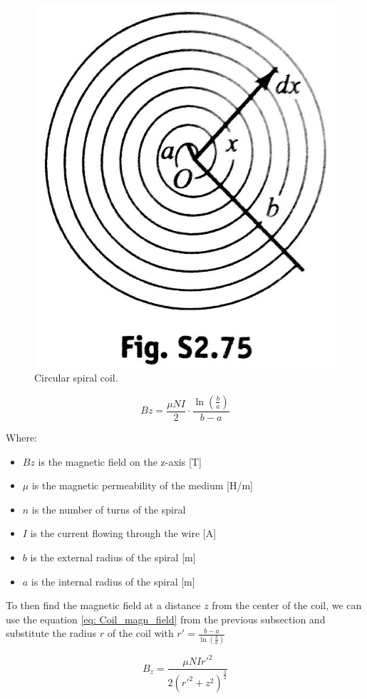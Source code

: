 \begin{figure}
    \centering
    \includegraphics[scale=0.4]{Chapters/Chapter2/PCB_coils/Figures/spiral_windings.jpg} %
    \caption[Coil spiral]{Circular spiral coil.}
    \label{fig: Coil spiral}
\end{figure}

\begin{equation}
    Bz = \frac{\mu N I}{2} \cdot \frac{\ln(\frac{b}{a})}{b-a} %
    \label{eq: Spiral_magn_field}
\end{equation}

Where:
\begin{itemize}
    \item $Bz$ is the magnetic field on the z-axis [T]
    \item $\mu$ is the magnetic permeability of the medium [H/m]
    \item $n$ is the number of turns of the spiral
    \item $I$ is the current flowing through the wire [A]
    \item $b$ is the external radius of the spiral [m]
    \item $a$ is the internal radius of the spiral [m]
\end{itemize}

To then find the magnetic field at a distance $z$ from the center of the coil, we can use the equation \eqref{eq: Coil_magn_field} from the previous subsection and substitute the radius $r$ of the coil with $r' = \frac{b-a}{\ln(\frac{b}{a})}$  

\begin{equation}
    B_z = \frac{\mu N I r'^2}{2(r'^2+z^2)^\frac{3}{2}} \label{eq: Spiral_magn_field_dist}
\end{equation}

